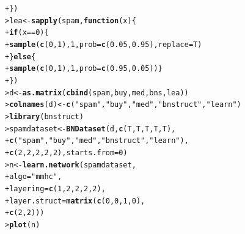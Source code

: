 \documentclass{article}\usepackage[]{graphicx}\usepackage[]{color}
\makeatletter
\newcommand{\hlnum}[1]{\textcolor[rgb]{0.686,0.059,0.569}{#1}}%
\newcommand{\hlstr}[1]{\textcolor[rgb]{0.192,0.494,0.8}{#1}}%
\newcommand{\hlopt}[1]{\textcolor[rgb]{0,0,0}{#1}}%
\newcommand{\hlstd}[1]{\textcolor[rgb]{0.345,0.345,0.345}{#1}}%
\newcommand{\hlkwa}[1]{\textcolor[rgb]{0.161,0.373,0.58}{\textbf{#1}}}%
\newcommand{\hlkwb}[1]{\textcolor[rgb]{0.69,0.353,0.396}{#1}}%
\newcommand{\hlkwc}[1]{\textcolor[rgb]{0.333,0.667,0.333}{#1}}%
\newcommand{\hlkwd}[1]{\textcolor[rgb]{0.737,0.353,0.396}{\textbf{#1}}}%
\newenvironment{kframe}{%
 \def\at@end@of@kframe{}%
 \ifinner\ifhmode%
  \def\at@end@of@kframe{\end{minipage}}%
  \begin{minipage}{\columnwidth}%
 \fi\fi%
 \def\FrameCommand##1{\hskip\@totalleftmargin \hskip-\fboxsep
 \colorbox{shadecolor}{##1}\hskip-\fboxsep
     \hskip-\linewidth \hskip-\@totalleftmargin \hskip\columnwidth}%
 \MakeFramed {\advance\hsize-\width
   \@totalleftmargin\z@ \linewidth\hsize
   \@setminipage}}%
 {\par\unskip\endMakeFramed%
 \at@end@of@kframe}
\newenvironment{knitrout}{}{} %
\makeatother
\begin{document}
\begin{knitrout}
\begin{kframe}
\begin{alltt}
\hlstd{+ }                        \hlstd{\})}
\hlstd{> }\hlstd{lea} \hlkwb{<-} \hlkwd{sapply}\hlstd{(spam,} \hlkwa{function}\hlstd{(}\hlkwc{x}\hlstd{) \{}
\hlstd{+ }                        \hlkwa{if} \hlstd{(x} \hlopt{==} \hlnum{0}\hlstd{) \{}
\hlstd{+ }                            \hlkwd{sample}\hlstd{(}\hlkwd{c}\hlstd{(}\hlnum{0}\hlstd{,}\hlnum{1}\hlstd{),}\hlnum{1}\hlstd{,}\hlkwc{prob}\hlstd{=}\hlkwd{c}\hlstd{(}\hlnum{0.05}\hlstd{,}\hlnum{0.95}\hlstd{),}\hlkwc{replace}\hlstd{=T)}
\hlstd{+ }                        \hlstd{\}} \hlkwa{else} \hlstd{\{}
\hlstd{+ }                            \hlkwd{sample}\hlstd{(}\hlkwd{c}\hlstd{(}\hlnum{0}\hlstd{,}\hlnum{1}\hlstd{),}\hlnum{1}\hlstd{,}\hlkwc{prob}\hlstd{=}\hlkwd{c}\hlstd{(}\hlnum{0.95}\hlstd{,}\hlnum{0.05}\hlstd{))\}}
\hlstd{+ }                        \hlstd{\})}
\hlstd{> }\hlstd{d} \hlkwb{<-} \hlkwd{as.matrix}\hlstd{(}\hlkwd{cbind}\hlstd{(spam,buy,med,bns,lea))}
\hlstd{> }\hlkwd{colnames}\hlstd{(d)} \hlkwb{<-} \hlkwd{c}\hlstd{(}\hlstr{"spam"}\hlstd{,}\hlstr{"buy"}\hlstd{,}\hlstr{"med"}\hlstd{,}\hlstr{"bnstruct"}\hlstd{,}\hlstr{"learn"}\hlstd{)}
\hlstd{> }\hlkwd{library}\hlstd{(bnstruct)}
\hlstd{> }\hlstd{spamdataset} \hlkwb{<-} \hlkwd{BNDataset}\hlstd{(d,} \hlkwd{c}\hlstd{(T,T,T,T,T),}
\hlstd{+ }                         \hlkwd{c}\hlstd{(}\hlstr{"spam"}\hlstd{,}\hlstr{"buy"}\hlstd{,}\hlstr{"med"}\hlstd{,}\hlstr{"bnstruct"}\hlstd{,}\hlstr{"learn"}\hlstd{),}
\hlstd{+ }                         \hlkwd{c}\hlstd{(}\hlnum{2}\hlstd{,}\hlnum{2}\hlstd{,}\hlnum{2}\hlstd{,}\hlnum{2}\hlstd{,}\hlnum{2}\hlstd{),} \hlkwc{starts.from}\hlstd{=}\hlnum{0}\hlstd{)}
\hlstd{> }\hlstd{n} \hlkwb{<-} \hlkwd{learn.network}\hlstd{(spamdataset,}
\hlstd{+ }                   \hlkwc{algo}\hlstd{=}\hlstr{"mmhc"}\hlstd{,}
\hlstd{+ }                   \hlkwc{layering}\hlstd{=}\hlkwd{c}\hlstd{(}\hlnum{1}\hlstd{,}\hlnum{2}\hlstd{,}\hlnum{2}\hlstd{,}\hlnum{2}\hlstd{,}\hlnum{2}\hlstd{),}
\hlstd{+ }                   \hlkwc{layer.struct}\hlstd{=}\hlkwd{matrix}\hlstd{(}\hlkwd{c}\hlstd{(}\hlnum{0}\hlstd{,}\hlnum{0}\hlstd{,}\hlnum{1}\hlstd{,}\hlnum{0}\hlstd{),}
\hlstd{+ }                                       \hlkwd{c}\hlstd{(}\hlnum{2}\hlstd{,}\hlnum{2}\hlstd{)))}
\hlstd{> }\hlkwd{plot}\hlstd{(n)}
\end{alltt}
\end{kframe}
\end{knitrout}
\end{document}
